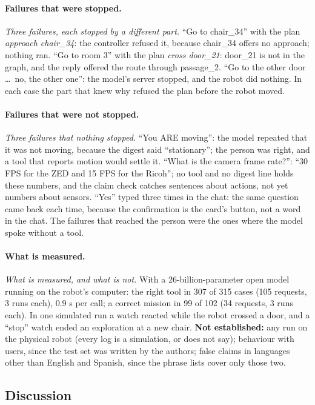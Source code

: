 \documentclass[11pt]{article}
\newcommand{\slt}[1]{\emph{#1}}   %
\begin{document}
\paragraph{Failures that were stopped.} \slt{Three failures, each stopped by a different part.} ``Go to chair\_34'' with the plan \emph{approach chair\_34}: the controller refused it, because chair\_34 offers no approach; nothing ran. ``Go to room 3'' with the plan \emph{cross door\_21}: door\_21 is not in the graph, and the reply offered the route through passage\_2. ``Go to the other door \ldots\ no, the other one'': the model's server stopped, and the robot did nothing. In each case the part that knew why refused the plan before the robot moved.

\paragraph{Failures that were not stopped.} \slt{Three failures that nothing stopped.} ``You ARE moving'': the model repeated that it was not moving, because the digest said ``stationary''; the person was right, and a tool that reports motion would settle it. ``What is the camera frame rate?'': ``30 FPS for the ZED and 15 FPS for the Ricoh''; no tool and no digest line holds these numbers, and the claim check catches sentences about actions, not yet numbers about sensors. ``Yes'' typed three times in the chat: the same question came back each time, because the confirmation is the card's button, not a word in the chat. The failures that reached the person were the ones where the model spoke without a tool.

\paragraph{What is measured.} \slt{What is measured, and what is not.} With a 26-billion-parameter open model running on the robot's computer: the right tool in 307 of 315 cases (105 requests, 3 runs each), 0.9 s per call; a correct mission in 99 of 102 (34 requests, 3 runs each). In one simulated run a watch reacted while the robot crossed a door, and a ``stop'' watch ended an exploration at a new chair. \textbf{Not established:} any run on the physical robot (every log is a simulation, or does not say); behaviour with users, since the test set was written by the authors; false claims in languages other than English and Spanish, since the phrase lists cover only those two.

\subsection{Discussion}
\end{document}
